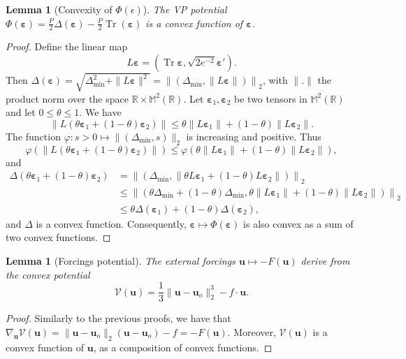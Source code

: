 \documentclass[11pt]{article}
\newtheorem{lemma}[theorem]{Lemma}
\newcommand{\bu}{\mathbf{u}}
\newcommand{\beps}{\boldsymbol{\varepsilon}}
\begin{document}
\begin{lemma}[Convexity of $\Phi(\epsilon)$]
\label{lemma: convexity of phi}
    The VP potential $\Phi(\beps)=\frac{P}{2}\Delta(\beps)- \frac{P}{2}\operatorname{Tr}(\beps)$ is a convex function of $\beps$.
\end{lemma}
\begin{proof}
Define the linear map
$$L\beps=
\left(\operatorname{Tr}\beps, \sqrt{2e^{-2}}\beps'\right).
$$
Then 
$\Delta(\beps) = \sqrt{\Delta_\text{min}^2 + \|L\beps\|^2} =
\left\|\left (\Delta_{\min},\|L\beps\| \right )\right\|_2$, with $\| . \|$ the product norm over the space $\mathbb{R} \times\mathbb{M}^2(\mathbb{R})$. Let \(\beps_1,\beps_2\) be two tensors in $\mathbb{M}^2(\mathbb{R})$ and let
\(0\leq \theta\leq 1\). We have
\[
\| L(\theta\beps_1+(1-\theta)\beps_2)\|
\leq
\theta \|L\beps_1\|+(1-\theta)\|L\beps_2 \|.
\]
The function $\varphi : s >0 \mapsto \|(\Delta_{\min}, s)\|_2$ is increasing and positive. Thus 
$$\varphi(\| L(\theta\beps_1+(1-\theta)\beps_2)\|)
\leq
\varphi(\theta \|L\beps_1\|+(1-\theta)\|L\beps_2 \|),
$$
and
$$
\begin{aligned}
\Delta(\theta \beps_1 + (1-\theta)\beps_2) &= 
\left\|\left (\Delta_{\min},\| \theta L\beps_1+(1-\theta)L\beps_2 \| \right )\right\|_2\\
& \leq \left\|\left (\theta \Delta_{\min} + (1-\theta ) \Delta_{\min}, \theta \| L\beps_1 \| +(1-\theta) \| L\beps_2 \| \right )\right\|_2\\
& \leq \theta \Delta (\beps_1) + (1-\theta) \Delta (\beps_2),
\end{aligned}
$$and $\Delta$ is a convex function. Consequently, $\beps \mapsto \Phi(\beps) $ is also convex as a sum of two convex functions.

\end{proof}

\begin{lemma}[Forcings potential]
\label{lemma:Forcing potential}
    The external forcings $\bu \mapsto -F(\bu)$ derive from the convex potential
    \begin{equation}
        \mathcal{V}(\bu)= \frac{1}{3} \|\bu-\bu_o\|_2^3 - f\cdot \bu.
    \end{equation}
\end{lemma} 
\begin{proof}
    Similarly to the previous proofs, we have that $\nabla_{\bu} \mathcal{V}(\bu)  = \|\bu-\bu_o\|_2 (\bu-\bu_o) -f = -F(\bu).$ Moreover, $\mathcal{V}(\bu)$ is a convex function of $\bu$, as a composition of convex functions.
\end{proof}
\end{document}
